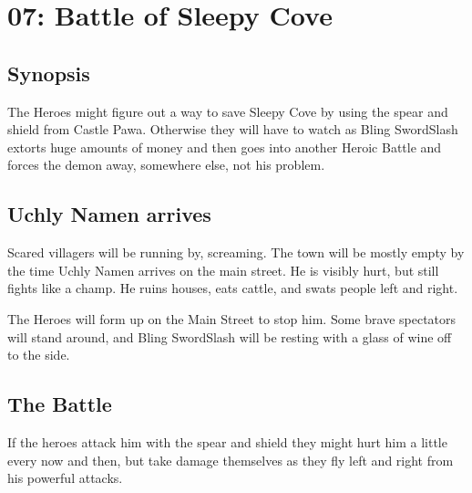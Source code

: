 %


















\clearpage
{}
\section*{07: Battle of Sleepy Cove}


\subsection*{Synopsis}
The Heroes might figure out a way to save Sleepy Cove by using the spear and shield from Castle Pawa. Otherwise they will have to watch as Bling SwordSlash extorts huge amounts of money and then goes into another Heroic Battle and forces the demon away, somewhere else, not his problem.


\subsection*{Uchly Namen arrives}
Scared villagers will be running by, screaming. The town will be mostly empty by the time Uchly Namen arrives on the main street. He is visibly hurt, but still fights like a champ. He ruins houses, eats cattle, and swats people left and right.

The Heroes will form up on the Main Street to stop him. Some brave spectators will stand around, and Bling SwordSlash will be resting with a glass of wine off to the side.


\subsection*{The Battle}
If the heroes attack him with the spear and shield they might hurt him a little every now and then, but take damage themselves as they fly left and right from his powerful attacks.

